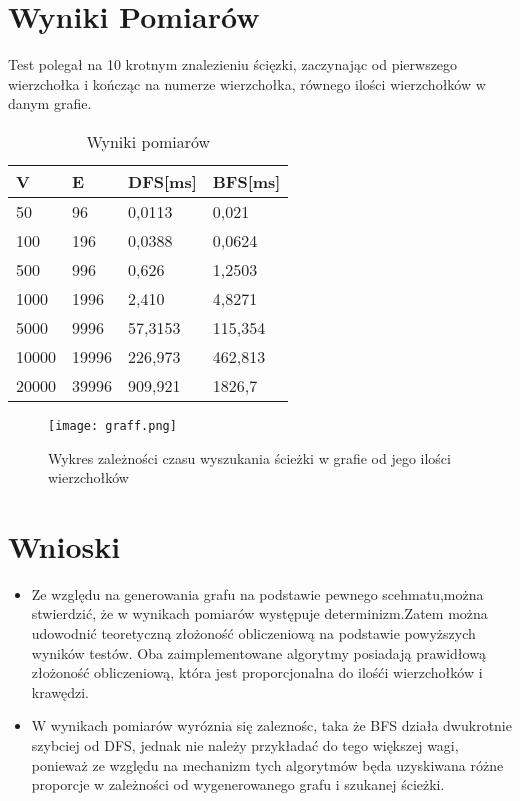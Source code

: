 \documentclass[12pt,a4paper,titlepage]{article}
\begin{document}
\section{Wyniki Pomiarów}
Test polegał na 10 krotnym znalezieniu ścięzki, zaczynając od pierwszego wierzchołka i kończąc na numerze wierzchołka, równego ilości wierzchołków w danym grafie.
\newpage
\begin{table}[h]
\begin{center}
\begin{tabular}{|l|l|l|l|}
\hline
V &E  &DFS[ms]  &BFS[ms]  \\ \hline
50 &96  &0,0113  &0,021  \\ \hline
100 &196 &0,0388  &0,0624  \\ \hline
500 &996  &0,626  &1,2503  \\ \hline
1000 &1996 &2,410  &4,8271  \\ \hline
5000 &9996  &57,3153  &115,354  \\ \hline
10000 &19996 &226,973  &462,813 \\ \hline
20000 &39996  &909,921  &1826,7  \\ \hline
\end{tabular}
\caption{Wyniki pomiarów}
\end{center}
\end{table}
\begin{figure}[!htbp]
\begin{center}
\texttt{[image: graff.png]}
\caption{Wykres zależności czasu wyszukania ścieżki w grafie od jego ilości wierzchołków}
\end{center}
\end{figure}
\section{Wnioski}
\begin{itemize}
\item Ze względu na generowania grafu na podstawie pewnego scehmatu,można stwierdzić, że w wynikach pomiarów występuje determinizm.Zatem można udowodnić teoretyczną złożoność obliczeniową na podstawie powyższych wyników testów. Oba zaimplementowane algorytmy posiadają prawidłową złożoność obliczeniową, która jest proporcjonalna do ilośći wierzchołków i krawędzi.

\item W wynikach pomiarów wyróznia się zaleznośc, taka że BFS działa dwukrotnie szybciej od DFS, jednak nie należy przykładać do tego większej wagi, ponieważ ze względu na mechanizm tych algorytmów będa uzyskiwana różne proporcje w zależności od wygenerowanego grafu i szukanej ścieżki.
\end{itemize}
\end{document}
